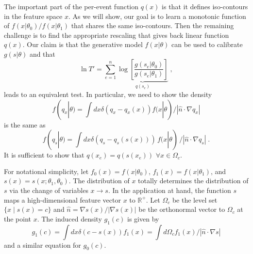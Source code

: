\documentclass[11pt, oneside]{article}   	%
\begin{document}
The important part of the per-event function $q(x)$ is that it defines iso-contours in the feature space $x$. As we will show, our goal is to learn a monotonic function of $f(x|\theta_0)/f(x|\theta_1)$ that shares the same iso-contours. Then the remaining challenge is to find the appropriate rescaling that gives back  linear function $q(x)$. Our claim is that the generative model $f(x|\theta)$ can be used to calibrate $g(s|\theta)$ and that
\begin{equation}
\ln T' = \sum_{e=1}^n \underbrace{\log \left[ \frac {g(s_e | \theta_0) }{ g(s_e | \theta_1) } \right]}_{q(s_e)} \;,
\end{equation}
leads to an equivalent test. In particular, we need to show the density
\begin{equation}
f(q_x|\theta) = \int dx \delta(q_x-q_x(x)) f(x|\theta)  / | \hat{n} \cdot \nabla q_x  |
\end{equation}
is the same as
\begin{equation}
f(q_s|\theta) = \int dx \delta(q_s-q_s(s(x))) \, f(x|\theta) \, / | \hat{n} \cdot \nabla q_s  | \; .
\end{equation}
It is sufficient to show that $q(x_e) = q(s(x_e))$ $ \forall x\in\Omega_c$.


For notational simplicity, let $f_0(x) = f(x|\theta_0)$, $f_1(x) = f(x|\theta_1)$, and $s(x)=s(x; \theta_1, \theta_0)$.
The distribution of $x$ totally determines the distribution of $s$ via the change of variables $x\to s$. 
In the application at hand, the function $s$ maps a high-dimensional feature vector $x$ to $\mathbb{R}^+$.
Let $\Omega_{c}$ be the level set $\{x \mid s(x) = c \}$ and $\hat{n}=\nabla s(x) / |\nabla s(x)|$ be the orthonormal vector to $\Omega_c$ at the point $x$. The induced density $g_1(c)$ is given by 
\begin{equation}
g_1(c) = \int dx \delta(c-s(x)) f_1(x) = \int d\Omega_c f_1(x)  / | \hat{n} \cdot \nabla s  |
\end{equation}
and a similar equation for $g_0(c)$. 
\end{document}
